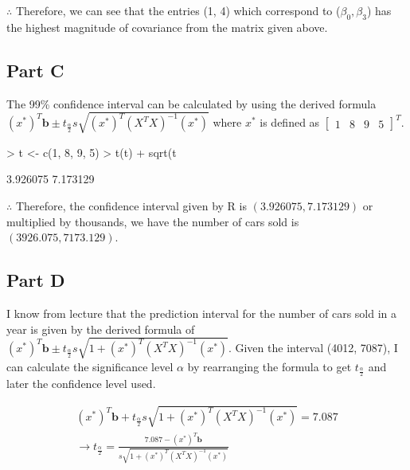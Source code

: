 \documentclass{article}
\begin{document}
\noindent $\therefore$ Therefore, we can see that the entries (1, 4) which correspond to ($\beta_0, \beta_3$) has the highest magnitude of covariance from the matrix given above.

\subsection {Part C}
The 99\% confidence interval can be calculated by using the derived formula $(x^*)^T\textbf{b} \pm t_\frac{\alpha}{2}s\sqrt{(x^*)^T(X^TX)^{-1}(x^*)}$ where $x^*$ is defined as $\begin{bmatrix}1 & 8 & 9 & 5 \end{bmatrix}^T$.

\begin{Schunk}
\begin{Sinput}
> t <- c(1, 8, 9, 5)
> t(t) %
+   sqrt(t %
\end{Sinput}
\begin{Soutput}
[1] 3.926075 7.173129
\end{Soutput}
\end{Schunk}

\noindent $\therefore$ Therefore, the confidence interval given by R is $(3.926075, 7.173129)$ or multiplied by thousands, we have the number of cars sold is $(3926.075, 7173.129)$.

\subsection{Part D}
I know from lecture that the prediction interval for the number of cars sold in a year is given by the derived formula of $(x^*)^T\textbf{b} \pm t_\frac{\alpha}{2}s\sqrt{1 + (x^*)^T(X^TX)^{-1}(x^*)}$. Given the interval (4012, 7087), I can calculate the significance level $\alpha$ by rearranging the formula to get $t_\frac{\alpha}{2}$ and later the confidence level used.

\begin{eqnarray*}
  (x^*)^T\textbf{b} + t_\frac{\alpha}{2}s\sqrt{1 + (x^*)^T(X^TX)^{-1}(x^*)} = 7.087 \\
  \rightarrow t_\frac{\alpha}{2} = \frac{7.087 - (x^*)^T\textbf{b}}{s\sqrt{1 + (x^*)^T(X^TX)^{-1}(x^*)}}
\end{eqnarray*}
\end{document}

